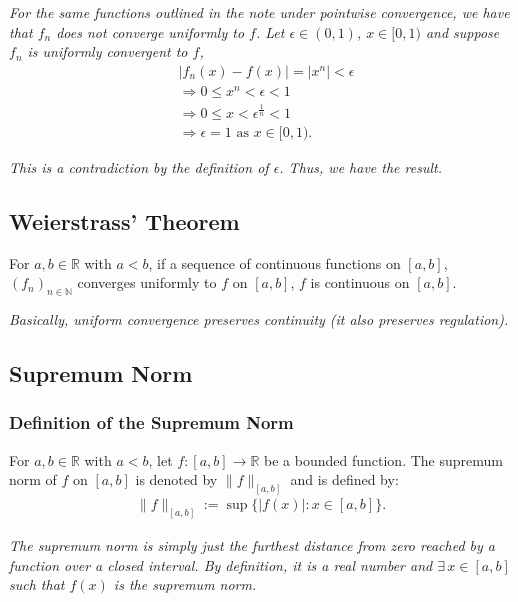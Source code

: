 \documentclass[a4paper, 12pt, twoside]{article}
\begin{document}
\textit{For the same functions outlined in the note under pointwise
convergence, we have that $f_n$ does not converge uniformly to $f$.
Let $\epsilon \in (0, 1)$, $x \in [0, 1)$ and suppose $f_n$ is
uniformly convergent to $f$,}
\begin{align*}
       & |f_n(x)-f(x)| = |x^n| < \epsilon                   \\
       & \Rightarrow 0 \leq x^n < \epsilon < 1              \\
       & \Rightarrow 0 \leq x < \epsilon^{\frac{1}{n}} < 1  \\
       & \Rightarrow \epsilon = 1 \text{ as } x \in [0, 1).
\end{align*}

\textit{This is a contradiction by the definition of $\epsilon$.
      Thus, we have the result.}

\subsection{Weierstrass' Theorem}

For $a, b \in \mathbb{R}$ with $a < b$, if a sequence of continuous
functions on $[a, b]$, $(f_n)_{n \in \mathbb{N}}$ converges
uniformly to $f$ on $[a, b]$, $f$ is continuous on $[a, b]$.

\vspace{\baselineskip}

\textit{Basically, uniform convergence preserves continuity (it also
      preserves regulation).}

\subsection{Supremum Norm}

\subsubsection{Definition of the Supremum Norm}

For $a, b \in \mathbb{R}$ with $a < b$, let $f:[a, b]\to\mathbb{R}$
be a bounded function. The supremum norm of $f$ on $[a,b]$ is
denoted by $\|f\|_{[a,b]}$ and is defined by:
\begin{align*}
      \|f\|_{[a,b]} := \sup{\{|f(x)| : x \in [a,b]\}}.
\end{align*}

\textit{The supremum norm is simply just the furthest distance from
      zero reached by a function over a closed interval. By definition,
      it is a real number and $\exists\,x \in [a, b]$ such that $f(x)$ is
      the supremum norm.}
\end{document}
